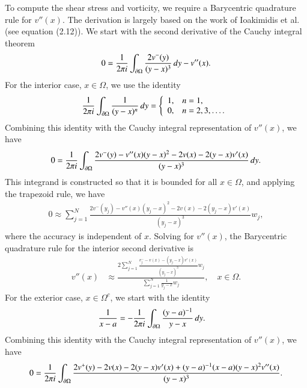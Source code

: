 \documentclass[preprint,10pt]{elsarticle}
\begin{document}
To compute the shear stress and vorticity, we require a Barycentric
quadrature rule for $v''(x)$.  The derivation is largely based on the
work of Ioakimidis et al.~\cite{ioa-pap-per1991} (see equation (2.12)).
We start with the second derivative of the Cauchy integral theorem
\begin{align}
  0 = \frac{1}{2\pi i} \int_{{\partial}\Omega} 
      \frac{2v^{-}(y)}{(y-x)^3}\,dy - v''(x).
\end{align}
For the interior case, $x \in \Omega$, we use the identity
\begin{align}
  \frac{1}{2\pi i}\int_{{\partial}\Omega} \frac{1}{(y-x)^n}\, dy = 
  \left\{
    \begin{array}{ll}
      1, & n = 1, \\
      0, & n = 2,3,\ldots. \\
    \end{array}
  \right.
\end{align}
Combining this identity with the Cauchy integral representation of
$v''(x)$, we have
\begin{align}
  0 = \frac{1}{2\pi i} \int_{{\partial}\Omega} 
      \frac{2v^{-}(y) - v''(x)(y-x)^2 - 2v(x) - 2(y-x)v'(x)}
      {(y-x)^3}\, dy.
\end{align}
This integrand is constructed so that it is bounded for all $x \in
\Omega$, and applying the trapezoid rule, we have
\begin{align}
  0 \approx  \sum_{j=1}^{N} 
      \frac{2v^{-}(y_j) - v''(x)(y_j-x)^2 - 2v(x) - 2(y_j-x)v'(x)}
      {(y_j-x)^3} w_j,
\end{align}
where the accuracy is independent of $x$.  Solving for $v''(x)$, the
Barycentric quadrature rule for the interior second derivative is
\begin{align}
  v''(x) &\approx \frac{2\sum\limits_{j=1}^N 
    \frac{v^{-}_{j} - v(x) - (y_j-x)v'(x)}{(y_j-x)^3}w_j}
    {\sum\limits_{j=1}^N \frac{1}{y_j-x}w_j}, \quad x \in \Omega.
\end{align}
For the exterior case, $x \in \Omega^c$, we start with the identity
\begin{align}
\frac{1}{x-a} &= -\frac{1}{2\pi i}\int_{{\partial}\Omega} 
    \frac{(y-a)^{-1}}{y-x}\, dy. 
\end{align}
Combining this identity with the Cauchy integral representation of
$v''(x)$, we have
\begin{align}
  0 = \frac{1}{2\pi i} \int_{{\partial}\Omega} 
    \frac{2v^+(y) - 2v(x) - 2(y-x)v'(x) + (y-a)^{-1} (x-a) (y-x)^2 v''(x)}
    {(y-x)^3}.
\end{align}
\end{document}
